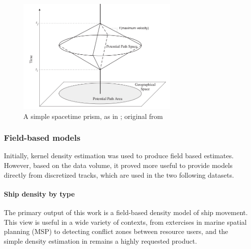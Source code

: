 \begin{figure}[h!]
  \centering
    \includegraphics[width=80mm]{images/measurement-theory-for-time-geography-prism.png}
  \caption {A simple space{\textendash}time prism, as in \citep{Miller2005}; original from \citep{Wu2002}}
  \label{fig:time-prism}
\end{figure}


\subsubsection{Field-based models}

Initially, kernel density estimation was used to produce field based estimates. However, based on the data volume, it proved more useful to provide models directly from discretized tracks, which are used in the two following datasets.

\paragraph{Ship density by type}

The primary output of this work is a field-based density model of ship movement. This view is useful in a wide variety of contexts, from extercises in marine spatial planning (MSP) to detecting conflict zones between resource users, and the simple density estimation in \cite{Halpern2008} remains a highly requested product. %

